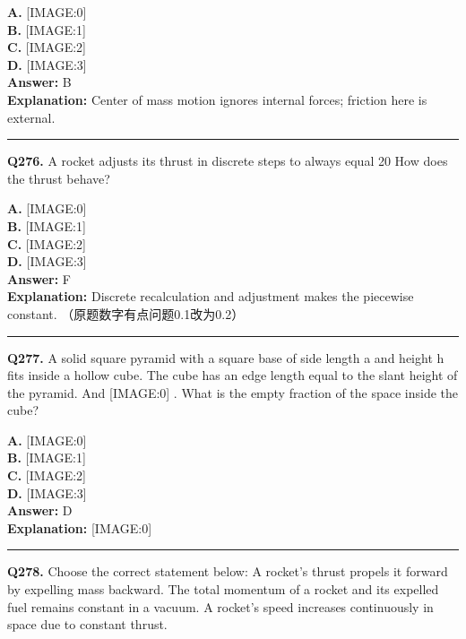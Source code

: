 \documentclass[12pt]{article}
\begin{document}
\textbf{A.} [IMAGE:0] \\
\textbf{B.} [IMAGE:1] \\
\textbf{C.} [IMAGE:2] \\
\textbf{D.} [IMAGE:3] \\

\textbf{Answer:} B \\
\textbf{Explanation:} Center of mass motion ignores internal forces; friction here is external.

\hrule
\vspace{1em}


\noindent
\textbf{Q276.} A rocket adjusts its thrust in discrete steps to always equal 20%
How does the thrust behave?



\textbf{A.} [IMAGE:0] \\
\textbf{B.} [IMAGE:1] \\
\textbf{C.} [IMAGE:2] \\
\textbf{D.} [IMAGE:3] \\

\textbf{Answer:} F \\
\textbf{Explanation:} Discrete recalculation and adjustment makes the piecewise constant.
（原题数字有点问题0.1改为0.2）

\hrule
\vspace{1em}


\noindent
\textbf{Q277.} A solid square pyramid with a square base of side length a
and height h
fits inside a hollow cube. The cube has an edge length equal to the slant height of the pyramid. And
[IMAGE:0]
. What is the empty fraction of the space inside the cube?



\textbf{A.} [IMAGE:0] \\
\textbf{B.} [IMAGE:1] \\
\textbf{C.} [IMAGE:2] \\
\textbf{D.} [IMAGE:3] \\

\textbf{Answer:} D \\
\textbf{Explanation:} [IMAGE:0]

\hrule
\vspace{1em}


\noindent
\textbf{Q278.} Choose the correct statement below:
A rocket’s thrust propels it forward by expelling mass backward.
The total momentum of a rocket and its expelled fuel remains constant in a vacuum.
A rocket’s speed increases continuously in space due to constant thrust.
\end{document}
